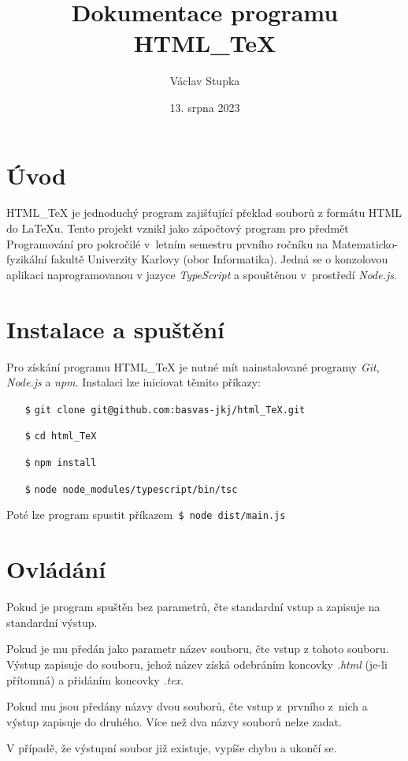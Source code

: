 \documentclass[a4paper,12pt]{article}
\title{Dokumentace programu HTML\_TeX}
\author{Václav Stupka}
\date{13. srpna 2023}
\begin{document}
	\maketitle
	\tableofcontents
	\pagebreak
	
	\section{Úvod}
	HTML\_TeX je jednoduchý program zajišťující překlad souborů z formátu HTML do LaTeXu.
	Tento projekt vznikl jako zápočtový program	pro předmět Programování pro pokročilé v~letním semestru prvního ročníku na Matema\-ticko-fyzikální fakultě Univerzity Karlovy (obor Informatika).
	Jedná se o konzolovou aplikaci naprogramovanou v jazyce \textit{TypeScript} a spouštěnou v~pro\-středí
	\textit{Node.js}.
	
	\section{Instalace a spuštění}
	Pro získání programu HTML\_TeX je nutné mít nainstalované programy \textit{Git}, \textit{Node.js} a \textit{npm}. Instalaci lze iniciovat těmito příkazy:
	\begin{itemize}
		\item[\texttt{\$}] \texttt{git clone git@github.com:basvas-jkj/html\_TeX.git}
		\item[\texttt{\$}] \texttt{cd html\_TeX}
		\item[\texttt{\$}] \texttt{npm install}
		\item[\texttt{\$}] \texttt{node node\_modules/typescript/bin/tsc}
	\end{itemize} 
	Poté lze program spustit příkazem\texttt{ \$ node dist/main.js}
	
	\section{Ovládání}
	Pokud je program spuštěn bez parametrů, čte standardní vstup a zapisuje na standardní výstup.
	
	Pokud je mu předán jako parametr název souboru, čte vstup z tohoto souboru. Výstup zapisuje do souboru, jehož název získá odebráním koncovky \textit{.html} (je-li přítomná) a přidáním koncovky \textit{.tex}.
	
	Pokud mu jsou předány názvy dvou souborů, čte vstup z~prvního z~nich a výstup zapisuje do druhého. Více než dva názvy souborů nelze zadat.
	
	V případě, že výstupní soubor již existuje, vypíše chybu a ukončí se.
	
\end{document}
